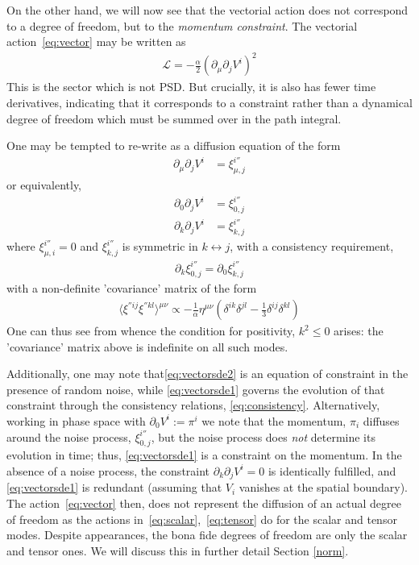 \documentclass[aps,preprintnumbers,superscriptaddress,longbibliography]{revtex4-1}
\begin{document}
On the other hand, we will now see that the vectorial action does not correspond to a degree of freedom, but to the {\it momentum constraint}\cite{arnowitt2008republication}. The vectorial action~\eqref{eq:vector} may be written as
\begin{align}
    \mathcal{L}=-\frac{\alpha}{2}(\partial_\mu \partial_j  V^{i})^2
\end{align}
This is the sector which is not PSD. But crucially, it is also has fewer time derivatives, indicating that it corresponds to a constraint rather than a dynamical degree of freedom which must be summed over in the path integral.

One may be tempted to re-write as a diffusion equation of the form 
\begin{align}
\label{eq:vectorsde}
   \partial_\mu \partial_j  V^{i}&=\xi_{\mu ,j}^{i''}
   \end{align} or equivalently,
   \begin{align}
       \label{eq:vectorsde1}
\partial_{0}\partial_jV^{i}&=\xi_{0,j}^{i''}\\  \label{eq:vectorsde2}\partial_{k}\partial_jV^{i}&=\xi_{k ,j}^{i''}
\end{align}
where $\xi_{\mu ,i}^{i''}=0$ and $\xi_{k ,j}^{i''}$ is symmetric in $k \leftrightarrow j$, with a consistency requirement, 
\begin{align}
\label{eq:consistency}
\partial_k\xi_{0,j}^{i''}=\partial_0\xi_{k,j}^{i''}
\end{align} with a non-definite 'covariance' matrix of the form
\begin{align}
\label{eq:vectorcovariance}
\langle\xi^{''ij}\xi^{''kl }\rangle ^{\mu\nu}\propto-\frac{1}{\alpha}\eta^{\mu\nu}(\delta^{ik}\delta^{jl}-\frac{1}{3}\delta^{ij}\delta^{kl})
\end{align}
One can thus see from whence the condition for positivity, $k^2\leq0$ arises: the 'covariance' matrix above is indefinite on all such modes. 

Additionally, one may note that\eqref{eq:vectorsde2} is an equation of constraint in the presence of random noise, while \eqref{eq:vectorsde1} governs the evolution of that constraint through the consistency relations, \eqref{eq:consistency}. Alternatively, working in phase space with $\partial_0V^{i}:=\pi^{i}$ we note that the momentum, $\pi_i$ diffuses around the noise process, $\xi_{0,j}^{i''}$, but the noise process does \textit{not} determine its evolution in time; thus, \eqref{eq:vectorsde1} is a constraint on the momentum. In the absence of a noise process, the constraint $\partial_k\partial_jV^i=0$ is identically fulfilled, and \eqref{eq:vectorsde1} is redundant (assuming that $V_i$ vanishes at the spatial boundary).  The action~\eqref{eq:vector} then, does not represent the diffusion of an actual degree of freedom as the actions in~\eqref{eq:scalar},~\eqref{eq:tensor} do for the scalar and tensor modes. Despite appearances, the bona fide degrees of freedom are only the scalar and tensor ones.  We will discuss this in further detail Section \ref{norm}.
\end{document}
